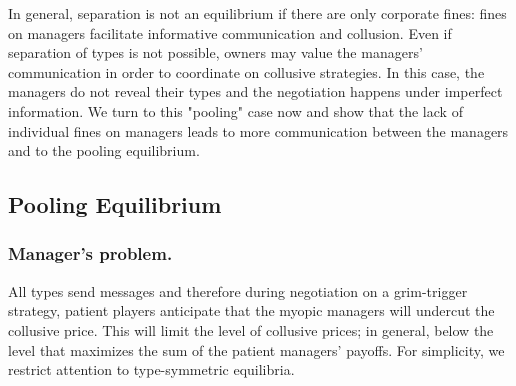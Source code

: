 \documentclass[]{article}
\begin{document}
In general, separation is not an equilibrium if there are only corporate fines: fines on managers facilitate informative communication and collusion. Even if separation of types is not possible, owners may value the managers' communication in order to coordinate on collusive strategies. In this case, the managers do not reveal their types and the negotiation happens under imperfect information. We turn to this "pooling" case now and show that the lack of individual fines on managers leads to more communication between the managers and to the pooling equilibrium.

\subsection{Pooling Equilibrium}
\subsubsection*{Manager's problem.}
All types send messages and therefore during negotiation on a grim-trigger strategy, patient players anticipate that the myopic managers will undercut the collusive price. This will limit the level of collusive prices; in general, below the level that maximizes the sum of the patient managers' payoffs. For simplicity, we restrict attention to type-symmetric equilibria. 
%
\end{document}

